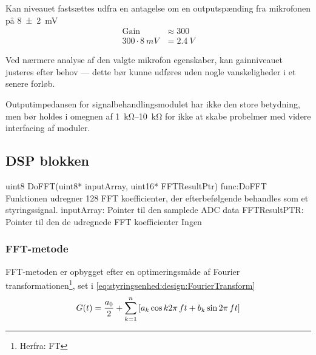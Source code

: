 Kan niveauet fastsættes udfra en antagelse om en outputspænding fra mikrofonen på \SI{8(2)}{mV} 
\begin{equation}
    \begin{split}
        \textrm{Gain} &\approx  300\\
       300 \cdot \SI{8}{mV} &= \SI{2.4}{V}
    \end{split}
\end{equation}

Ved nærmere analyse af den valgte mikrofon egenskaber, kan gainniveauet justeres efter behov --- dette bør kunne udføres uden nogle vanskeligheder i et senere forløb.

Outputimpedansen for signalbehandlingsmodulet har ikke den store betydning, men bør holdes i omegnen af \SIrange{1}{10}{\kohm} for ikke at skabe probelmer med videre interfacing af moduler. 




\subsection{DSP blokken}


\begin{functionDescription}
    {uint8 DoFFT(uint8* inputArray, uint16* FFTResultPtr)}
    {func:DoFFT}
    {Funktionen udregner 128 FFT koefficienter, der efterbefølgende behandles som et styringssignal. }
    {inputArray: Pointer til den samplede ADC data\newline
    FFTResultPTR: Pointer til den de udregnede FFT koefficienter}
    {Ingen}
\end{functionDescription}

\subsubsection{FFT-metode}
FFT-metoden er opbygget efter en optimeringsmåde af Fourier transformationen\footnote{Herfra: FT}, set i \eqref{eq:styringsenhed:design:FourierTransform}
\begin{equation}\label{eq:styringsenhed:design:FourierTransform}
    \begin{split}
G(t) = \frac{a_0}{2} + \sum_{k = 1}^{n}\left[ a_k \cos k 2\pi\, f t + b_k \sin 2\pi\, f t \right]  
    \end{split}
\end{equation}

